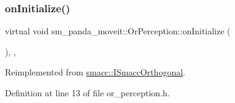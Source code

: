 \subsubsection{\texorpdfstring{on\+Initialize()}{onInitialize()}}
{\footnotesize\ttfamily virtual void sm\+\_\+panda\+\_\+moveit\+::\+Or\+Perception\+::on\+Initialize (\begin{DoxyParamCaption}{ }\end{DoxyParamCaption})\hspace{0.3cm}{\ttfamily [inline]}, {\ttfamily [override]}, {\ttfamily [virtual]}}



Reimplemented from \hyperlink{classsmacc_1_1ISmaccOrthogonal_a6bb31c620cb64dd7b8417f8705c79c7a}{smacc\+::\+I\+Smacc\+Orthogonal}.



Definition at line 13 of file or\+\_\+perception.\+h.


